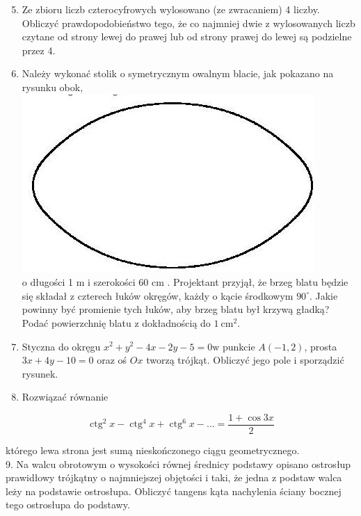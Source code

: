 \documentclass[10pt]{article}
\begin{document}
\begin{enumerate}
  \setcounter{enumi}{4}
  \item Ze zbioru liczb czterocyfrowych wylosowano (ze zwracaniem) 4 liczby. Obliczyć prawdopodobieństwo tego, że co najmniej dwie z wylosowanych liczb czytane od strony lewej do prawej lub od strony prawej do lewej są podzielne przez 4.
  \item Należy wykonać stolik o symetrycznym owalnym blacie, jak pokazano na rysunku obok,\\
\includegraphics[max width=\textwidth, center]{2024_11_16_8518088a6e381b1443b2g-7}\\
o długości 1 m i szerokości 60 cm . Projektant przyjął, że brzeg blatu będzie się składał z czterech łuków okręgów, każdy o kącie środkowym $90^{\circ}$. Jakie powinny być promienie tych łuków, aby brzeg blatu był krzywą gładką? Podać powierzchnię blatu z dokładnością do $1 \mathrm{~cm}^{2}$.
  \item Styczna do okręgu $x^{2}+y^{2}-4 x-2 y-5=0 \mathrm{w}$ punkcie $A(-1,2)$, prosta $3 x+4 y-10=0$ oraz oś $O x$ tworzą trójkąt. Obliczyć jego pole i sporządzić rysunek.
  \item Rozwiązać równanie
\end{enumerate}

$$
\operatorname{ctg}^{2} x-\operatorname{ctg}^{4} x+\operatorname{ctg}^{6} x-\ldots=\frac{1+\cos 3 x}{2}
$$

którego lewa strona jest sumą nieskończonego ciągu geometrycznego.\\
9. Na walcu obrotowym o wysokości równej średnicy podstawy opisano ostrosłup prawidłowy trójkątny o najmniejszej objętości i taki, że jedna z podstaw walca leży na podstawie ostrosłupa. Obliczyć tangens kąta nachylenia ściany bocznej tego ostrosłupa do podstawy.
\end{document}
